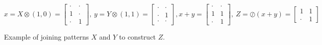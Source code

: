 \small
$$
x = X\otimes (1,0) =
\begin{bmatrix}
\cdot & \cdot \\[-.2em]
1 & \cdot \\[-.2em]
\cdot & 1
\end{bmatrix}\!\!, \
y = Y\otimes (1,1) =
\begin{bmatrix}
\cdot & \cdot \\[-.2em]
\cdot & 1 \\[-.2em]
\cdot & \cdot
\end{bmatrix}\!\!,
x + y =
\begin{bmatrix}
\cdot & \cdot \\[-.2em]
1 & 1 \\[-.2em]
\cdot & 1
\end{bmatrix}\!\!, \
Z = \oslash(x+y)=
\begin{bmatrix}
1 & 1 \\[-.2em]
\cdot & 1
\end{bmatrix}\!\!
$$
\caption{Example of joining patterns $X$ and $Y$ to construct $Z$.}
